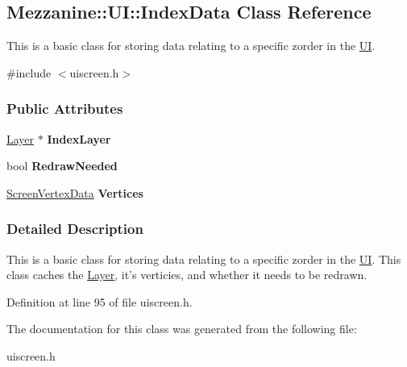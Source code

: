 \hypertarget{structMezzanine_1_1UI_1_1IndexData}{
\subsection{Mezzanine::UI::IndexData Class Reference}
\label{structMezzanine_1_1UI_1_1IndexData}
}


This is a basic class for storing data relating to a specific zorder in the \hyperlink{namespaceMezzanine_1_1UI}{UI}.  




{\ttfamily \#include $<$uiscreen.h$>$}

\subsubsection*{Public Attributes}
\begin{DoxyCompactItemize}
\item 
\hypertarget{structMezzanine_1_1UI_1_1IndexData_a8e6a4dca4acb796c7178cca505204d73}{
\hyperlink{classMezzanine_1_1UI_1_1Layer}{Layer} $\ast$ {\bfseries IndexLayer}}
\label{structMezzanine_1_1UI_1_1IndexData_a8e6a4dca4acb796c7178cca505204d73}

\item 
\hypertarget{structMezzanine_1_1UI_1_1IndexData_aefa2db8d9e40d69a22d27435cb605dc1}{
bool {\bfseries RedrawNeeded}}
\label{structMezzanine_1_1UI_1_1IndexData_aefa2db8d9e40d69a22d27435cb605dc1}

\item 
\hypertarget{structMezzanine_1_1UI_1_1IndexData_a3cf2e913b777078bce4859a66500c57a}{
\hyperlink{classMezzanine_1_1UI_1_1ScreenVertexData}{ScreenVertexData} {\bfseries Vertices}}
\label{structMezzanine_1_1UI_1_1IndexData_a3cf2e913b777078bce4859a66500c57a}

\end{DoxyCompactItemize}


\subsubsection{Detailed Description}
This is a basic class for storing data relating to a specific zorder in the \hyperlink{namespaceMezzanine_1_1UI}{UI}. This class caches the \hyperlink{classMezzanine_1_1UI_1_1Layer}{Layer}, it's verticies, and whether it needs to be redrawn. 

Definition at line 95 of file uiscreen.h.



The documentation for this class was generated from the following file:\begin{DoxyCompactItemize}
\item 
uiscreen.h\end{DoxyCompactItemize}
